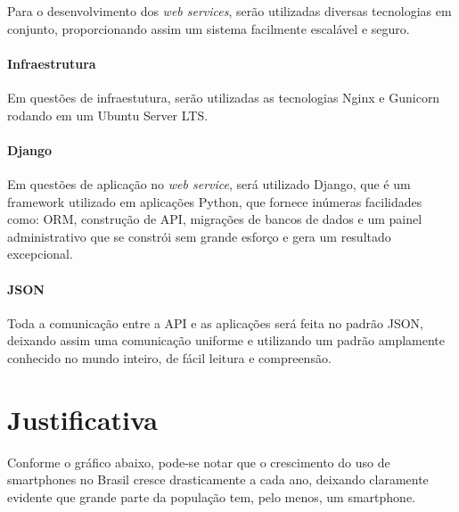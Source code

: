 \documentclass[
	12pt,
	oneside,
	a4paper,
	english,
	brazil,
]{abntex2}
\begin{document}
Para o desenvolvimento dos \emph{web services}, serão utilizadas diversas tecnologias em conjunto, proporcionando assim um sistema facilmente escalável e seguro. 

\subsubsection{Infraestrutura}

Em questões de infraestutura, serão utilizadas as tecnologias Nginx e Gunicorn rodando em um Ubuntu Server LTS.

\subsubsection{Django}

Em questões de aplicação no \emph{web service}, será utilizado Django, que é um framework utilizado em aplicações Python, que fornece inúmeras facilidades como: ORM, construção de API, migrações de bancos de dados e um painel administrativo que se constrói sem grande esforço e gera um resultado excepcional.

\subsubsection{JSON}

Toda a comunicação entre a API e as aplicações será feita no padrão JSON, deixando assim uma comunicação uniforme e utilizando um padrão amplamente conhecido no mundo inteiro, de fácil leitura e compreensão.



\chapter{Justificativa}

Conforme o gráfico abaixo, pode-se notar que o crescimento do uso de smartphones no Brasil cresce drasticamente a cada ano, deixando claramente evidente que grande parte da população tem, pelo menos, um smartphone.
\end{document}

